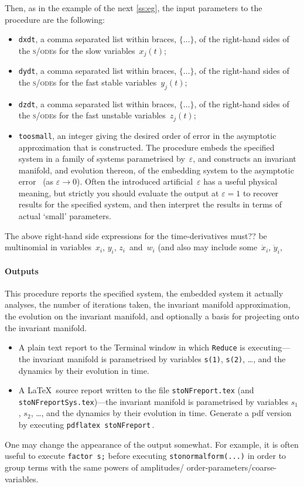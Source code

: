\documentclass[11pt,a5paper]{article}
\def\eps{\varepsilon}
\def\sde{\textsc{s/ode}}
\begin{document}
Then, as in the example of the next \cref{ss:eg}, the input
parameters to the procedure are the following:
\begin{itemize}
\item \verb|dxdt|, a comma separated list within braces, \(\{\ldots\}\), of the right-hand sides of the \sde{}s for the slow variables~\(x_j(t)\);

\item \verb|dydt|, a comma separated list within braces, \(\{\ldots\}\), of the right-hand sides of the \sde{}s for the fast stable variables~\(y_j(t)\);

\item \verb|dzdt|, a comma separated list within braces, \(\{\ldots\}\), of the right-hand sides of the \sde{}s for the fast unstable variables~\(z_j(t)\);

\item \verb|toosmall|, an integer giving the desired order
of error in the asymptotic approximation that is
constructed.  The procedure embeds the specified system in a
family of systems parametrised by~\(\eps\), and constructs
an invariant manifold, and evolution thereon, of the
embedding system to the asymptotic error~\Ord{\eps^{\tt
toosmall}} (as \(\eps\to0\)). Often the introduced
artificial~\(\eps\) has a useful physical meaning, but
strictly you should evaluate the output at \(\eps=1\) to
recover results for the specified system, and then interpret
the results in terms of actual `small' parameters.
\end{itemize}

The above right-hand side expressions for the time-derivatives must?? be multinomial in variables~$x_i$, $y_i$, $z_i$~and~$w_i$ (and also may include some~\(\dot x_i\), \(\dot y_i\), 


\paragraph{Outputs}  This procedure reports the specified
system, the embedded system it actually analyses, the number
of iterations taken, the invariant manifold approximation,
the evolution on the invariant manifold, and optionally a
basis for projecting onto the invariant manifold.
\begin{itemize}
\item A plain text report to the Terminal window in which
\verb|Reduce| is executing---the invariant manifold is
parametrised by variables \verb|s(1)|, \verb|s(2)|, \ldots,
and the dynamics by their evolution in time.
\item A \LaTeX\ source report written to the file
\verb|stoNFreport.tex| (and
\verb|stoNFreportSys.tex|)---the invariant manifold is
parametrised by variables \(s_1\), \(s_2\), \ldots, and the
dynamics by their evolution in time.  Generate a pdf version
by executing \verb|pdflatex stoNFreport|\,.
\end{itemize}
One may change the appearance of the output somewhat. For
example, it is often useful to execute  \verb|factor s;|
before executing \verb|stonormalform(...)| in order to
group terms with the same powers of amplitudes\slash
order-parameters\slash coarse-variables.
\end{document}
